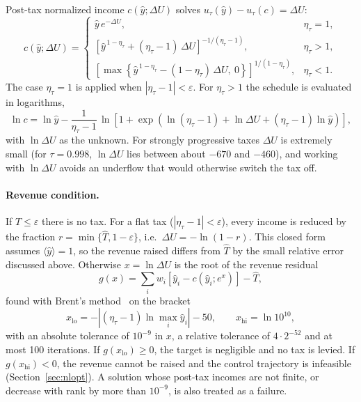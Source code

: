 \documentclass[11pt]{article}
\newcommand{\etat}{\eta_{\tau}}
\begin{document}
Post-tax normalized income $c(\hat y;\Delta U)$ solves
$u_\tau(\hat y) - u_\tau(c) = \Delta U$:
\begin{equation}
  c(\hat y;\Delta U) =
  \begin{cases}
    \hat y\,e^{-\Delta U}, & \etat = 1,\\[4pt]
    \left[\hat y^{\,1-\etat} + (\etat-1)\,\Delta U\right]^{-1/(\etat-1)}, & \etat > 1,\\[4pt]
    \left[\max\left\{\hat y^{\,1-\etat} - (1-\etat)\,\Delta U,\ 0\right\}\right]^{1/(1-\etat)}, & \etat < 1.
  \end{cases}
  \label{eq:schedule}
\end{equation}
The case $\etat = 1$ is applied when $|\etat - 1| < \varepsilon$. For
$\etat>1$ the schedule is evaluated in logarithms,
\begin{equation}
  \ln c = \ln\hat y - \frac{1}{\etat-1}\,
  \ln\!\left[1 + \exp\!\left(\ln(\etat-1) + \ln\Delta U + (\etat-1)\ln\hat y\right)\right],
\end{equation}
with $\ln\Delta U$ as the unknown. For strongly progressive taxes $\Delta U$
is extremely small (for $\tau = 0.998$, $\ln\Delta U$ lies between about
$-670$ and $-460$), and working with $\ln\Delta U$ avoids an underflow that
would otherwise switch the tax off.

\paragraph{Revenue condition.} If $T \le \varepsilon$ there is no tax. For a
flat tax ($|\etat - 1|<\varepsilon$), every income is reduced by the fraction
$r = \min\{\hat T, 1-\varepsilon\}$, i.e.\ $\Delta U = -\ln(1-r)$. This closed
form assumes $\langle\hat y\rangle = 1$, so the revenue raised differs from
$\hat T$ by the small relative error discussed above. Otherwise
$x = \ln\Delta U$ is the root of the revenue residual
\begin{equation}
  g(x) = \sum_{i} w_i\left[\hat y_i - c\left(\hat y_i; e^{x}\right)\right] - \hat T ,
  \label{eq:revenue}
\end{equation}
found with Brent's method~\cite{Brent1973} on the bracket
\begin{equation}
  x_{\mathrm{lo}} = -\left|(\etat-1)\ln\max_i \hat y_i\right| - 50,
  \qquad x_{\mathrm{hi}} = \ln 10^{10},
\end{equation}
with an absolute tolerance of $10^{-9}$ in $x$, a relative tolerance of
$4\cdot2^{-52}$ and at most 100 iterations. If $g(x_{\mathrm{lo}})\ge0$, the
target is negligible and no tax is levied. If $g(x_{\mathrm{hi}})<0$, the
revenue cannot be raised and the control trajectory is infeasible
(Section~\ref{sec:nlopt}). A solution whose post-tax incomes are not finite,
or decrease with rank by more than $10^{-9}$, is also treated as a failure.
\end{document}
